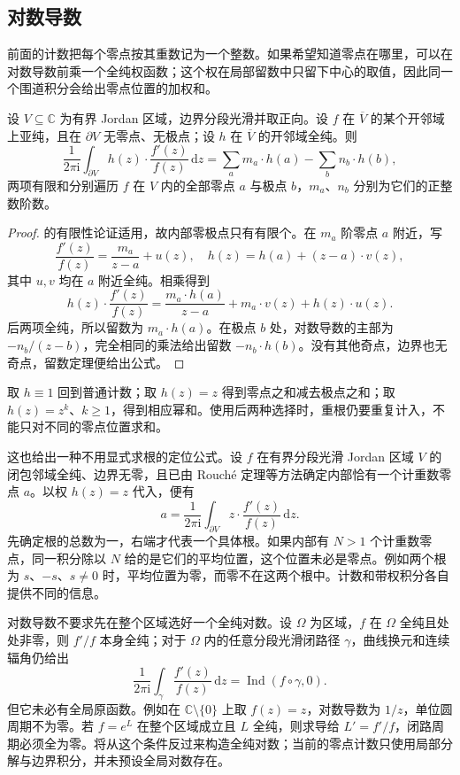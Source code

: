 \subsection{对数导数}
\label{b3:subsec:030404}

前面的计数把每个零点按其重数记为一个整数。如果希望知道零点在哪里，可以在对数导数前乘一个全纯权函数；这个权在局部留数中只留下中心的取值，因此同一个围道积分会给出零点位置的加权和。

\begin{proposition}[加权零点计数]\label{b3:prop:03-weighted-zeros}
设 \(V\subseteq\mathbb C\) 为有界 Jordan 区域，边界分段光滑并取正向。设 \(f\) 在 \(\overline V\) 的某个开邻域上亚纯，且在 \(\partial V\) 无零点、无极点；设 \(h\) 在 \(\overline V\) 的开邻域全纯。则
\[
 \frac1{2\pi\mathrm{i}}\int_{\partial V}
       h(z)\cdot\frac{f'(z)}{f(z)}\,\mathrm{d}z
 =\sum_a m_a\cdot h(a)-\sum_b n_b\cdot h(b),
\]
两项有限和分别遍历 \(f\) 在 \(V\) 内的全部零点 \(a\) 与极点 \(b\)，\(m_a\)、\(n_b\) 分别为它们的正整数阶数。
\end{proposition}
\begin{proof}
的有限性论证适用，故内部零极点只有有限个。在 \(m_a\) 阶零点 \(a\) 附近，写
\[
 \frac{f'(z)}{f(z)}=\frac{m_a}{z-a}+u(z),
 \quad h(z)=h(a)+(z-a)\cdot v(z),
\]
其中 \(u,v\) 均在 \(a\) 附近全纯。相乘得到
\[
 h(z)\cdot\frac{f'(z)}{f(z)}
 =\frac{m_a\cdot h(a)}{z-a}+m_a\cdot v(z)+h(z)\cdot u(z).
\]
后两项全纯，所以留数为 \(m_a\cdot h(a)\)。在极点 \(b\) 处，对数导数的主部为 \(-n_b/(z-b)\)，完全相同的乘法给出留数 \(-n_b\cdot h(b)\)。没有其他奇点，边界也无奇点，留数定理便给出公式。
\end{proof}

取 \(h\equiv1\) 回到普通计数；取 \(h(z)=z\) 得到零点之和减去极点之和；取 \(h(z)=z^k\)、\(k\ge1\)，得到相应幂和。使用后两种选择时，重根仍要重复计入，不能只对不同的零点位置求和。

\ProseParagraphBreak

这也给出一种不用显式求根的定位公式。设 \(f\) 在有界分段光滑 Jordan 区域 \(V\) 的闭包邻域全纯、边界无零，且已由 Rouché 定理等方法确定内部恰有一个计重数零点 \(a\)。以权 \(h(z)=z\) 代入，便有
\[
 a=\frac1{2\pi\mathrm{i}}\int_{\partial V}
                  z\cdot\frac{f'(z)}{f(z)}\,\mathrm{d}z.
\]
先确定根的总数为一，右端才代表一个具体根。如果内部有 \(N>1\) 个计重数零点，同一积分除以 \(N\) 给的是它们的平均位置，这个位置未必是零点。例如两个根为 \(s\)、\(-s\)、\(s\ne0\) 时，平均位置为零，而零不在这两个根中。计数和带权积分各自提供不同的信息。

\ProseParagraphBreak

对数导数不要求先在整个区域选好一个全纯对数。设 \(\Omega\) 为区域，\(f\) 在 \(\Omega\) 全纯且处处非零，则 \(f'/f\) 本身全纯；对于 \(\Omega\) 内的任意分段光滑闭路径 \(\gamma\)，曲线换元和连续辐角仍给出
\[
 \frac1{2\pi\mathrm{i}}\int_\gamma\frac{f'(z)}{f(z)}\,\mathrm{d}z
 =\operatorname{Ind}(f\circ\gamma,0).
\]
但它未必有全局原函数。例如在 \(\mathbb C\setminus\{0\}\) 上取 \(f(z)=z\)，对数导数为 \(1/z\)，单位圆周期不为零。若 \(f=e^L\) 在整个区域成立且 \(L\) 全纯，则求导给 \(L'=f'/f\)，闭路周期必须全为零。将从这个条件反过来构造全纯对数；当前的零点计数只使用局部分解与边界积分，并未预设全局对数存在。
